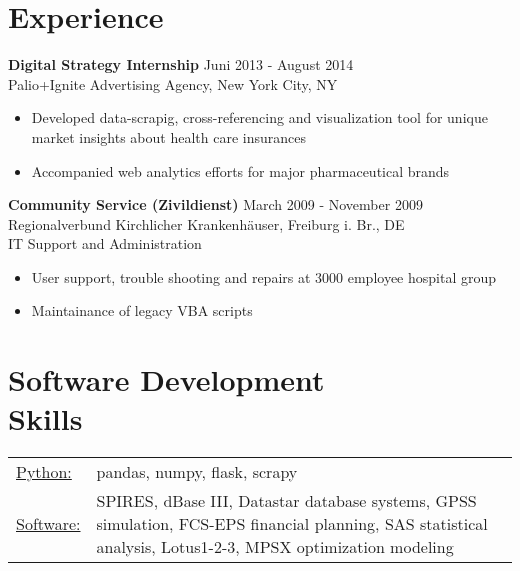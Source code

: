 \documentclass[margin]{res}
\begin{document}
\begin{resume}
\section{Experience} 
{\bf Digital Strategy Internship} \hfill Juni 2013 - August 2014\\
Palio+Ignite Advertising Agency, New York City, NY\\
\begin{itemize} \itemsep -2pt  %
\item Developed data-scrapig, cross-referencing and visualization tool for unique market insights about health care insurances
\item Accompanied web analytics efforts for major pharmaceutical brands
 \end{itemize}

{\bf Community Service (Zivildienst)} \hfill March 2009 - November 2009\\
Regionalverbund Kirchlicher Krankenh{\"a}user, Freiburg i. Br., DE \\
IT Support and Administration
\begin{itemize} \itemsep -2pt  %
\item User support, trouble shooting and repairs at 3000 employee hospital group
\item Maintainance of legacy VBA scripts
\end{itemize}



\section{Software Development \\ Skills}
   \begin{tabular}{l p{3in}}
    \underline{Python:} & pandas, numpy, flask, scrapy \\

     \underline{Software:} &  SPIRES, dBase III, Datastar database 
                        systems, GPSS simulation, FCS-EPS financial 
                        planning, SAS statistical analysis, 
                        Lotus1-2-3, MPSX optimization modeling 
 \end{tabular}

\end{resume} 
\end{document}
